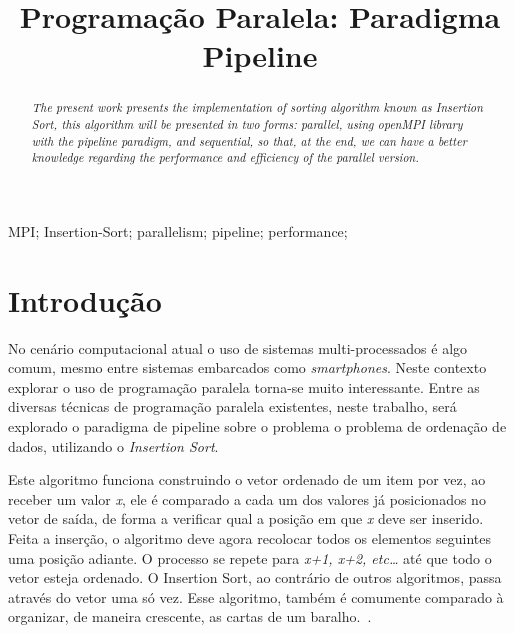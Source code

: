 \documentclass[portuguese, conference]{IEEEtran}
\begin{document}
\title{Programação Paralela: Paradigma Pipeline}

\author{
}

\maketitle

\begin{abstract}
\it{The present work presents the implementation of sorting algorithm known as Insertion Sort, this algorithm will be presented in two forms: parallel, using openMPI library with the pipeline paradigm, and sequential, so that, at the end, we can have a better knowledge regarding the performance and efficiency of the parallel version.}
\end{abstract}

\begin{IEEEkeywords}
MPI; Insertion-Sort; parallelism; pipeline; performance;
\end{IEEEkeywords}

\IEEEpeerreviewmaketitle

\section{Introdução}
No cenário computacional atual o uso de sistemas multi-processados é algo comum, mesmo entre sistemas embarcados como \textit{smartphones}. Neste contexto explorar o uso de programação paralela torna-se muito interessante. Entre as diversas técnicas de programação paralela existentes, neste trabalho, será explorado o paradigma de pipeline sobre o problema o problema de ordenação de dados, utilizando o \textit{Insertion Sort}.

Este algoritmo funciona construindo o vetor ordenado de um item por vez, ao receber um valor \textit{x}, ele é comparado a cada um dos valores já posicionados no vetor de saída, de forma a verificar qual a posição em que \textit{x} deve ser inserido. Feita a inserção, o algoritmo deve agora recolocar todos os elementos seguintes uma posição adiante. O processo se repete para \textit{x+1, x+2, etc…} até que todo o vetor esteja ordenado. O Insertion Sort, ao contrário de outros algoritmos, passa através do vetor uma só vez. Esse algoritmo, também é comumente comparado à organizar, de maneira crescente, as cartas de um baralho.~\cite{Insertion}.
\end{document}
